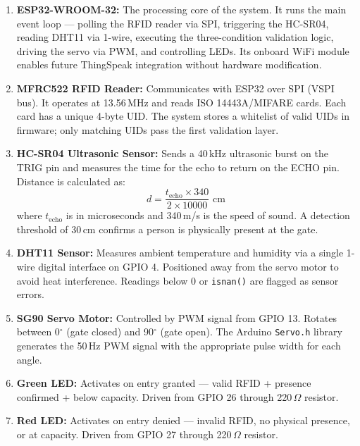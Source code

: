 \documentclass[12pt,a4paper]{report}
\begin{document}
\begin{enumerate}[leftmargin=*]

\item \textbf{ESP32-WROOM-32:} The processing core of the system. It runs the main event loop --- polling the RFID reader via SPI, triggering the HC-SR04, reading DHT11 via 1-wire, executing the three-condition validation logic, driving the servo via PWM, and controlling LEDs. Its onboard WiFi module enables future ThingSpeak integration without hardware modification.

\item \textbf{MFRC522 RFID Reader:} Communicates with ESP32 over SPI (VSPI bus). It operates at 13.56\,MHz and reads ISO 14443A/MIFARE cards. Each card has a unique 4-byte UID. The system stores a whitelist of valid UIDs in firmware; only matching UIDs pass the first validation layer.

\item \textbf{HC-SR04 Ultrasonic Sensor:} Sends a 40\,kHz ultrasonic burst on the TRIG pin and measures the time for the echo to return on the ECHO pin. Distance is calculated as:
\[
d = \frac{t_{\text{echo}} \times 340}{2 \times 10000} \text{ cm}
\]
where $t_{\text{echo}}$ is in microseconds and 340\,m/s is the speed of sound. A detection threshold of 30\,cm confirms a person is physically present at the gate.

\item \textbf{DHT11 Sensor:} Measures ambient temperature and humidity via a single 1-wire digital interface on GPIO 4. Positioned away from the servo motor to avoid heat interference. Readings below 0 or \texttt{isnan()} are flagged as sensor errors.

\item \textbf{SG90 Servo Motor:} Controlled by PWM signal from GPIO 13. Rotates between 0$^\circ$ (gate closed) and 90$^\circ$ (gate open). The Arduino \texttt{Servo.h} library generates the 50\,Hz PWM signal with the appropriate pulse width for each angle.

\item \textbf{Green LED:} Activates on entry granted --- valid RFID + presence confirmed + below capacity. Driven from GPIO 26 through 220\,$\Omega$ resistor.

\item \textbf{Red LED:} Activates on entry denied --- invalid RFID, no physical presence, or at capacity. Driven from GPIO 27 through 220\,$\Omega$ resistor.

\end{enumerate}
\end{document}
